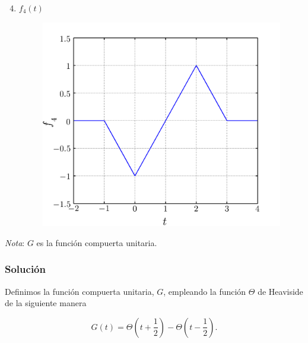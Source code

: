 \documentclass[a4paper,12pt,final]{article}
\begin{document}
      \begin{minipage}[t]{0.5\textwidth}
        \begin{enumerate}[label=\alph*)]
          \setcounter{enumi}{3}
          \item $f_4\left(t\right)$
            \vspace{-1.0em}
            \begin{figure}[H]
              \begin{flushright}
                \includegraphics[width=\textwidth-30pt]{./laboratorio_4/problema01_f4.png}
              \end{flushright}
            \end{figure}\vspace{-1.0em}
        \end{enumerate}
      \end{minipage}%


      \noindent \emph{Nota}: $G$ es la función compuerta unitaria.

    \subsubsection*{Solución}
      \noindent Definimos la función compuerta unitaria, $G$, empleando la función
      $\Theta$ de Heaviside de la siguiente manera

      \begin{equation*}
         G\left(t\right) = \Theta\left(t + \frac{1}{2}\right) -
                           \Theta\left(t - \frac{1}{2}\right).
      \end{equation*}
\end{document}

